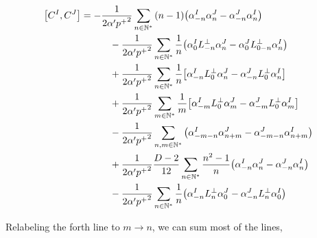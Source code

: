 \begin{align*}
    \comm{C^{I}}{C^{J}}&=-\frac{1}{2\alpha'{p^+}^2}\sum\limits_{n\in\mathbb N^\ast}\qty(n-1)\qty(\alpha^I_{-n}\alpha^J_n-\alpha^J_{-n}\alpha^I_n)\\
    &\quad\quad\quad-\frac{1}{2\alpha'{p^+}^2}\sum\limits_{n\in\mathbb N^\ast}\frac{1}{n}\qty(\alpha_{0}^IL^\perp_{-n}\alpha^J_n-\alpha^J_{0}L^\perp_{0-n}\alpha^I_n)\\
    &\quad\quad\quad+\frac{1}{2\alpha'{p^+}^2}\sum\limits_{n\in\mathbb N^\ast}\frac1n\qty[\alpha^I_{-n}L^\perp_{0}\alpha_n^J-\alpha^J_{-n}L^\perp_{0}\alpha_n^I]\\
    &\quad\quad\quad+\frac{1}{2\alpha'{p^+}^2}\sum\limits_{m\in\mathbb N^\ast}\frac1m\qty[\alpha^I_{-m}L^\perp_{0}\alpha_m^J-\alpha^J_{-m}L^\perp_{0}\alpha_m^I]\\
    &\quad\quad\quad-\frac{1}{2\alpha'{p^+}^2}\sum\limits_{n,m\in\mathbb N^\ast}\left(\alpha^I_{-m-n}\alpha^J_{n+m}-\alpha^J_{-m-n}\alpha^I_{n+m}\right)\\
    &\quad\quad\quad+\frac{1}{2\alpha'{p^+}^2}\frac{D-2}{12}\sum\limits_{n\in\mathbb N^\ast}\frac{n^2-1}{n}\qty(\alpha^I_{-n}\alpha_n^J-\alpha^J_{-n}\alpha_n^I)\\
    &\quad\quad\quad-\frac{1}{2\alpha'{p^+}^2}\sum\limits_{n\in\mathbb N^\ast}\frac{1}{n}\qty(\alpha_{-n}^IL^\perp_{n}\alpha^J_{0}-\alpha_{-n}^JL^\perp_{n}\alpha^I_{0})
\end{align*}

Relabeling the forth line to $m\rightarrow n$, we can sum most of the lines,

